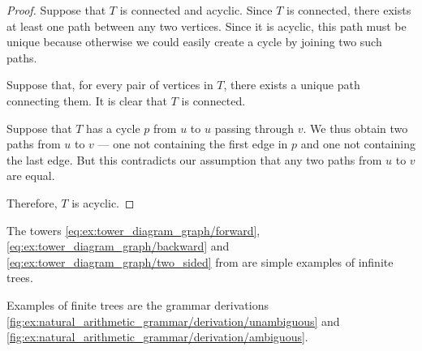 \begin{proof}
   Suppose that \( T \) is connected and acyclic. Since \( T \) is connected, there exists at least one path between any two vertices. Since it is acyclic, this path must be unique because otherwise we could easily create a cycle by joining two such paths.

   Suppose that, for every pair of vertices in \( T \), there exists a unique path connecting them. It is clear that \( T \) is connected.

  Suppose that \( T \) has a cycle \( p \) from \( u \) to \( u \) passing through \( v \). We thus obtain two paths from \( u \) to \( v \) --- one not containing the first edge in \( p \) and one not containing the last edge. But this contradicts our assumption that any two paths from \( u \) to \( v \) are equal.

  Therefore, \( T \) is acyclic.
\end{proof}

\begin{example}\label{ex:def:tree}
  The towers \eqref{eq:ex:tower_diagram_graph/forward}, \eqref{eq:ex:tower_diagram_graph/backward} and \eqref{eq:ex:tower_diagram_graph/two_sided} from  are simple examples of infinite trees.

  Examples of finite trees are the grammar derivations \cref{fig:ex:natural_arithmetic_grammar/derivation/unambiguous} and \cref{fig:ex:natural_arithmetic_grammar/derivation/ambiguous}.
\end{example}

